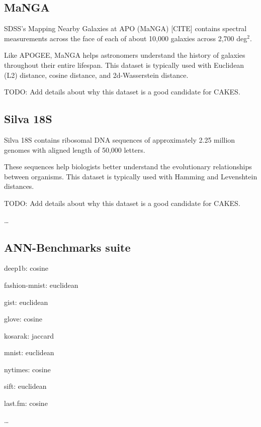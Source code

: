 \subsection{MaNGA}
\label{subsec:datasets:manga}
SDSS's Mapping Nearby Galaxies at APO (MaNGA) [CITE] contains spectral measurements across the face of each of 
about 10,000 galaxies across 2,700 deg$^2$. 

Like APOGEE, MaNGA helps astronomers understand the history of galaxies throughout their entire lifespan. This 
dataset is typically used with Euclidean (L2) distance, cosine distance, and 2d-Wasserstein distance. 


TODO: Add details about why this dataset is a good candidate for CAKES. 

\subsection{Silva 18S}
\label{subsec:datasets:silva-18s}

Silva 18S contains ribosomal DNA sequences of approximately 2.25 
million genomes with aligned length of 50,000 letters. 


These sequences help biologists better understand the evolutionary relationships between organisms. 
This dataset is typically used with Hamming and Levenshtein distances. 


TODO: Add details about why this dataset is a good candidate for CAKES.

\dots

\subsection{ANN-Benchmarks suite}
\label{subsec:datasets:ann-benchmarks-suite}

deep1b: cosine

fashion-mnist: euclidean

gist: euclidean

glove: cosine

kosarak: jaccard

mnist: euclidean

nytimes: cosine

sift: euclidean

last.fm: cosine

\dots
